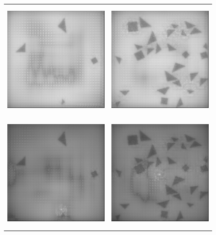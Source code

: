 \begin{figure}
    \begin{center}
        \begin{tabular}{c c}
            \includegraphics[width = 2.3in, height = 2.3in]{Counting/LaTeX/figures/putasideall/nolimitscaleresamplingoptiondifferentactivationnetworkputaside/image1/saliency.png}   & \includegraphics[width = 2.3in, height = 2.3in]{Counting/LaTeX/figures/putasideall/nolimitscaleresamplingoptiondifferentactivationnetworkputaside/image2/saliency.png} \\
            \includegraphics[width = 2.3in, height = 2.3in]{Counting/LaTeX/figures/putasideall/nolimitscaleresamplingoptiondifferentactivationnetworkputaside/image1/1-saliency.png}   & \includegraphics[width = 2.3in, height = 2.3in]{Counting/LaTeX/figures/putasideall/nolimitscaleresamplingoptiondifferentactivationnetworkputaside/image2/1-saliency.png} \\

\end{tabular}
\end{center}
\end{figure}

